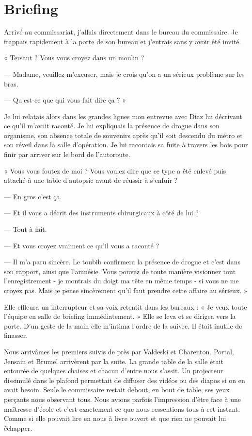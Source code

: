 \chapter{Briefing}

Arrivé au commissariat, j'allais directement dans le bureau du commissaire. Je frappais rapidement à la porte de son
bureau et j'entrais sans y avoir été invité.

« Tersant ? Vous vous croyez dans un moulin ?

— Madame, veuillez m'excuser, mais je crois qu'on a un sérieux problème sur les bras.

— Qu'est-ce que qui vous fait dire ça ? »

Je lui relatais alors dans les grandes lignes mon  entrevue avec Diaz lui décrivant ce qu'il m'avait raconté. Je lui
expliquais la présence de drogue dans son organisme, son absence totale de souvenirs après qu'il soit descendu du
métro et son réveil dans la salle d'opération. Je lui racontais sa fuite à travers les bois pour finir par arriver 
sur le bord de l'autoroute.

« Vous vous foutez de moi ? Vous voulez dire que ce type a été enlevé puis attaché à une table d'autopsie avant de
réussir à s'enfuir ?

— En gros c'est ça.

— Et il vous a décrit des instruments chirurgicaux à côté de lui ?

— Tout à fait.

— Et vous croyez vraiment ce qu'il vous a raconté ?

— Il m'a paru sincère. Le toubib confirmera la présence de drogue et c'est dans son rapport, ainsi que l'amnésie. Vous
pouvez de toute manière visionner tout l'enregistrement - je montrais du doigt ma tête en même temps - si vous ne me
croyez pas. Mais je pense sincèrement qu'il faut prendre cette affaire au sérieux. »

Elle effleura un interrupteur et sa voix retentit dans les bureaux : « Je veux toute l'équipe en salle de briefing
immédiatement. » Elle se leva et se dirigea vers la porte. D'un geste de la main elle m'intima l'ordre de la suivre. Il
était inutile de finasser. 

Nous arrivâmes les premiers suivis de près par Valdeski et Charenton. Portal, Jensain et Brumel arrivèrent par la 
suite. La grande table de la salle était entourée de quelques chaises et chacun d'entre nous s'assit. Un projecteur 
dissimulé  dans le plafond permettait de diffuser des vidéos ou des diapos si on en avait besoin. Seule le commissaire 
restait debout, en bout de table, ses yeux perçants nous observant tous. Nous avions parfois l'impression d'être face à 
une maîtresse d'école et c'est exactement ce que nous ressentions tous à cet instant. Comme si elle pouvait lire en nous 
à livre ouvert et que rien ne pouvait lui échapper.

